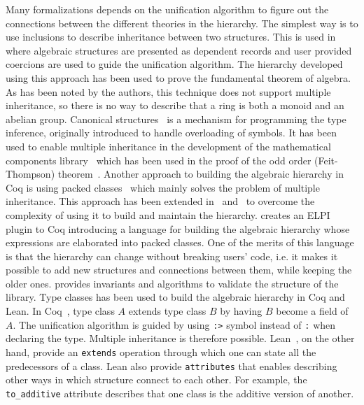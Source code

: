 Many formalizations depends on the unification algorithm to figure out the connections between the different theories in the hierarchy. 
The simplest way is to use inclusions to describe inheritance between two structures. This is used in~\cite{Geuvers2002} where algebraic structures are presented as dependent records and user provided coercions are used to guide the unification algorithm. The hierarchy developed using this approach has been used to prove the fundamental theorem of algebra. As has been noted by the authors, this technique does not support multiple inheritance, so there is no way to describe that a ring is both a monoid and an abelian group. 
Canonical structures~\cite{canonical2013} is a mechanism for programming the type inference, originally introduced to handle overloading of symbols. It has been used to enable multiple inheritance in the development of the mathematical components library~\cite{mathCompBook2020} which has been used in the proof of the odd order (Feit-Thompson) theorem~\cite{gonthier2013oddOrderTheorem}. 
Another approach to building the algebraic hierarchy in Coq is using packed classes~\cite{Gonthier2009} which mainly solves the problem of multiple inheritance. This approach has been extended in~\cite{cohen2020hierarchy} and~\cite{sakaguchi2020validating} to overcome the complexity of using it to build and maintain the hierarchy. \cite{cohen2020hierarchy} creates an ELPI~\cite{elpi,elpiForCoq} plugin to Coq introducing a language for building the algebraic hierarchy whose expressions are elaborated into packed classes. One of the merits of this language is that the hierarchy can change without breaking users' code, i.e. it makes it possible to add new structures and connections between them, while keeping the older ones. \cite{sakaguchi2020validating} provides invariants and algorithms to validate the structure of the library.  
Type classes has been used to build the algebraic hierarchy in Coq and Lean. In Coq~\cite{spitters2011type}, type class $A$ extends type class $B$ by having $B$ become a field of $A$. The unification algorithm is guided by using \verb|:>| symbol instead of \verb|:| when declaring the type. Multiple inheritance is therefore possible. Lean~\cite{lean2019}, on the other hand, provide an \verb|extends| operation through which one can state all the predecessors of a class. Lean also provide \verb|attributes| that enables describing other ways in which structure connect to each other. For example, the \verb|to_additive| attribute describes that one class is the additive version of another.

